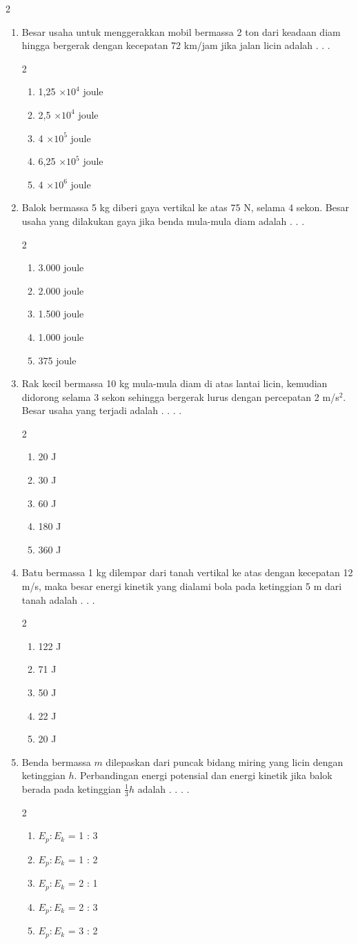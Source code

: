 \documentclass[10pt,a4paper]{article}
\newcommand{\pilgani}[1]{                            \vspace{-0.3cm}\begin{multicols}{2}
 \begin{enumerate}[label=\Alph*., itemsep=0pt,topsep=0pt,leftmargin=*,align=Center]#1                     \end{enumerate}
 \phantom{ini cuma sapi, wedus, dan ayam}
 \end{multicols}}
\begin{document}
\begin{multicols*} {2}
\begin{enumerate}
        
    \item Besar usaha untuk menggerakkan mobil bermassa 2 ton dari keadaan diam hingga bergerak dengan kecepatan 72 km/jam jika jalan licin adalah . . . 
    \pilgani{
    \item 1,25 $\times10^4$ joule
    \item 2,5 $\times10^4$ joule
    \item 4 $\times10^5$ joule
    \item 6,25 $\times10^5$ joule
    \item 4 $\times10^6$ joule }
      \vspace {3cm}
      
      \item Balok bermassa 5 kg diberi gaya vertikal ke atas 75 N, selama 4 sekon. Besar usaha yang dilakukan gaya jika benda mula-mula diam adalah . . .
      \pilgani{
      \item 3.000 joule
      \item 2.000 joule
      \item 1.500 joule
      \item 1.000 joule
      \item 375 joule
      } \vspace {3cm}
      
      \item Rak kecil bermassa 10 kg mula-mula diam di atas lantai licin, kemudian didorong selama 3 sekon sehingga bergerak lurus dengan percepatan 2 m/s$^2$. Besar usaha yang terjadi adalah . . . .
      \pilgani{
      \item 20 J
      \item 30 J
      \item 60 J
      \item 180 J
      \item 360 J
      }  \vspace {3cm}
      
      \item Batu bermassa 1 kg dilempar dari tanah vertikal ke atas dengan kecepatan 12 m/s, maka besar energi kinetik yang dialami bola pada ketinggian 5 m dari tanah adalah . . . 
      \pilgani{
      \item 122 J
      \item 71 J
      \item 50 J
      \item 22 J
      \item 20 J
      }  \vspace {3cm}
      
      \item Benda bermassa $m$ dilepaskan dari puncak bidang miring yang licin dengan ketinggian $h$. Perbandingan energi potensial dan energi kinetik jika balok berada pada ketinggian $\frac{1}{3}h$ adalah . . . .
      \pilgani{
      \item $E_p : E_k$ = 1 : 3
      \item $E_p : E_k$ = 1 : 2
      \item $E_p : E_k$ = 2 : 1
      \item $E_p : E_k$ = 2 : 3
      \item $E_p : E_k$ = 3 : 2
    }\vspace {3cm}
    

\end{enumerate}
\end{multicols*}
\end{document}
